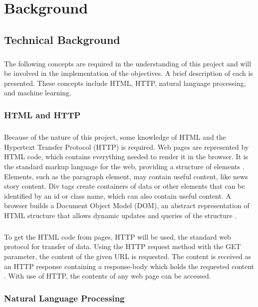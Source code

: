 \documentclass[11pt,titlepage]{report}
\begin{document}
\chapter{Background}
\section{Technical Background}
\paragraph{}
The following concepts are required in the understanding of this project and will be involved in the implementation of the objectives. A brief description of each is presented. These concepts include HTML, HTTP, natural language processing, and machine learning. 
\subsection{HTML and HTTP}\label{html_http_section} 
\paragraph{}
Because of the nature of this project, some knowledge of HTML and the Hypertext Transfer Protocol (HTTP) is required. Web pages are represented by HTML code, which contains everything needed to render it in the browser. It is the standard markup language for the web, providing a structure of elements \cite{w3c_html}. Elements, such as the paragraph element, may contain useful content, like news story content. Div tags create containers of data or other elements that can be identified by an id or class name, which can also contain useful content. A browser builds a Document Object Model (DOM), an abstract representation of HTML structure that allows dynamic updates and queries of the structure \cite{practical_jquery}.
\paragraph{}
To get the HTML code from pages, HTTP will be used, the standard web protocol for transfer of data. Using the HTTP request method with the GET parameter, the content of the given URL is requested. The content is received as an HTTP response containing a response-body which holds the requested content \cite{RFC2616}. With use of HTTP, the contents of any web page can be accessed.
\subsection{Natural Language Processing}
\end{document}
